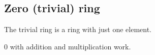 
\subsection{Zero (trivial) ring}

The trivial ring is a ring with just one element.

\(0\) with addition and multiplication work.

